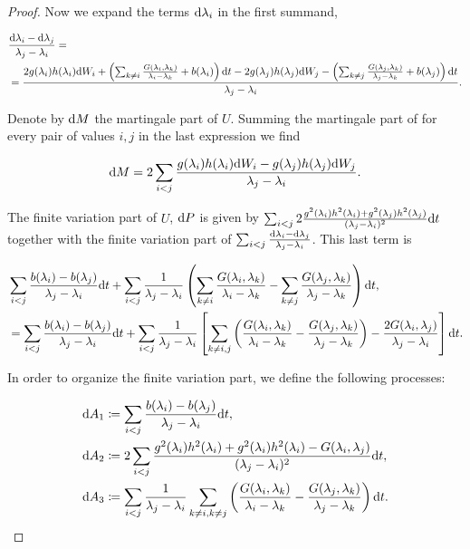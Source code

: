 \begin{proof}
    Now we expand the terms $\mathrm d \lambda_i$ in the first summand,

    \begin{align*}
        &\frac{\mathrm d \lambda_i - \mathrm d \lambda_j}{\lambda_j - \lambda_i} =\\ 
        &=\frac{ 2g(\lambda_i)h(\lambda_i)\mathrm d W_i + \left(\sum_{k\neq i} \frac{G(\lambda_i,\lambda_k)}{\lambda_i - \lambda_k} + b(\lambda_i)\right)\mathrm d t - 2g(\lambda_j)h(\lambda_j)\mathrm d W_j - \left(\sum_{k\neq j} \frac{G(\lambda_j,\lambda_k)}{\lambda_j - \lambda_k} + b(\lambda_j)\right)\mathrm d t }{\lambda_j - \lambda_i}.
    \end{align*}

    Denote by $\mathrm d M$ the martingale part of $U$. Summing the martingale part of for every pair of values $i,j$ in the last expression we find

    \[\mathrm d M = 2 \sum_{i<j} \frac{g(\lambda_i)h(\lambda_i)\mathrm d W_i - g(\lambda_j)h(\lambda_j)\mathrm d W_j}{\lambda_j - \lambda_i}.\]

    The finite variation part of $U$, $\mathrm d P$ is given by $\sum_{i<j}2\frac{g^2(\lambda_i)h^2(\lambda_i)+g^2(\lambda_j)h^2(\lambda_j)}{(\lambda_j - \lambda_i)^2}\mathrm d t$ together with the finite variation part of $\sum_{i<j}\frac{\mathrm d \lambda_i - \mathrm d \lambda_j}{\lambda_j - \lambda_i}$. This last term is

    \begin{align*}
        &\sum_{i<j} \frac{b(\lambda_i) - b(\lambda_j)}{\lambda_j - \lambda_i}\mathrm d t + \sum_{i<j}\frac1{\lambda_j-\lambda_i}\left(\sum_{k\neq i}\frac{G(\lambda_i,\lambda_k)}{\lambda_i-\lambda_k} - \sum_{k\neq j}\frac{G(\lambda_j,\lambda_k)}{\lambda_j-\lambda_k} \right)\mathrm d t,\\
        &= \sum_{i<j} \frac{b(\lambda_i) - b(\lambda_j)}{\lambda_j - \lambda_i}\mathrm d t + \sum_{i<j}\frac1{\lambda_j-\lambda_i}\left[\sum_{k\neq i,j}\left(\frac{G(\lambda_i,\lambda_k)}{\lambda_i-\lambda_k} -\frac{G(\lambda_j,\lambda_k)}{\lambda_j-\lambda_k} \right) - \frac{2G(\lambda_i,\lambda_j)}{\lambda_j-\lambda_i} \right]\mathrm d t.
    \end{align*}

    In order to organize the finite variation part, we define the following processes:

    \begin{align*}
        \mathrm d A_1 &\coloneqq \sum_{i<j} \frac{b(\lambda_i) - b(\lambda_j)}{\lambda_j - \lambda_i}\mathrm d t,\\
        \mathrm d A_2 &\coloneqq 2\sum_{i<j} \frac{g^2(\lambda_i)h^2(\lambda_i) + g^2(\lambda_i)h^2(\lambda_i) - G(\lambda_i,\lambda_j)}{(\lambda_j - \lambda_i)^2}\mathrm d t,\\
        \mathrm d A_3 &\coloneqq \sum_{i<j}\frac{1}{\lambda_j-\lambda_i}\sum_{k\neq i, k \neq j}\left( \frac{G(\lambda_i,\lambda_k)}{\lambda_i-\lambda_k} - \frac{G(\lambda_j,\lambda_k)}{\lambda_j - \lambda_k} \right) \mathrm d t.\\
    \end{align*}


\end{proof}
